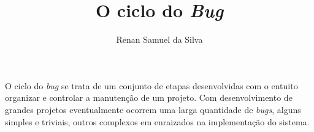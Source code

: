 \documentclass[a4paper,12pt]{article}
\title{O ciclo do \textit{Bug}}
\author{Renan Samuel da Silva}
\begin{document}
  
\maketitle

\begin{abstract}

\end{abstract}

\section{}
O ciclo do \textit{bug} se trata de um conjunto de etapas desenvolvidas com o entuito 
organizar e controlar a manutenção de um projeto. Com desenvolvimento de grandes projetos
eventualmente ocorrem uma larga quantidade de \textit{bugs}, alguns simples e triviais, 
outros complexos em enraizados na implementação do sistema.
\end{document}
